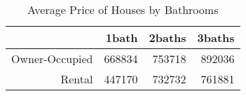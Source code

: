 \begin{table}[ht]
\centering
\begin{tabular}{rrrr}
  \hline
 & 1bath & 2baths & 3baths \\ 
  \hline
Owner-Occupied & 668834 & 753718 & 892036 \\ 
  Rental & 447170 & 732732 & 761881 \\ 
   \hline
\end{tabular}
\caption{Average Price of Houses by Bathrooms} 
\label{tab:avg_price_by_bath}
\end{table}
